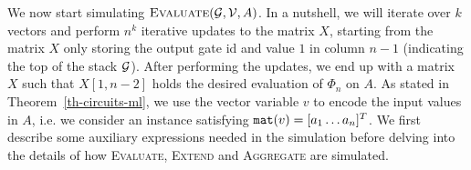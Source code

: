 
\medskip
We now start simulating $\textsc{Evaluate}(\mathcal{G},\mathcal{V},A)$. In a nutshell, we will iterate over $k$ vectors and perform
$n^k$ iterative updates to the matrix $X$, starting from the matrix $X$ only storing the output gate id and value $1$ in column $n-1$
(indicating the top of the stack $\mathcal{G}$). After performing the updates, we end up with a matrix $X$ such that $X[1,n-2]$ holds the desired
evaluation of $\Phi_n$ on $A$. As stated in Theorem~\ref{th-circuits-ml}, we use the vector variable $v$ to encode the input values in $A$, i.e. we consider
an instance satisfying $\texttt{mat}(v) = [a_1 \ldots a_n]^T$.  We first describe
some auxiliary \langfor expressions needed in the simulation before delving into the details of how \textsc{Evaluate}, \textsc{Extend} and \textsc{Aggregate}
are simulated.

